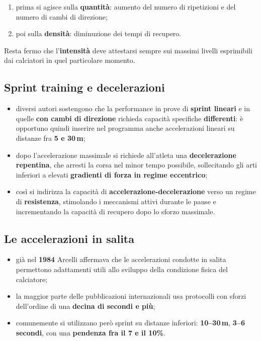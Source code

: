 \begin{enumerate}
  \item prima si agisce sulla \textbf{quantità}: aumento del numero di ripetizioni e del numero di
    cambi di direzione;
  \item poi sulla \textbf{densità}: diminuzione dei tempi di recupero.
\end{enumerate}

Resta fermo che l'\textbf{intensità} deve attestarsi sempre sui massimi livelli esprimibili dai
calciatori in quel particolare momento.

\subsection{Sprint training e decelerazioni}

\begin{itemize}
  \item diversi autori sostengono che la performance in prove di \textbf{sprint lineari} e in quelle
    \textbf{con cambi di direzione} richieda capacità specifiche \textbf{differenti}: è opportuno
    quindi inserire nel programma anche accelerazioni lineari su distanze fra \textbf{5 e 30\,m};
  \item dopo l'accelerazione massimale si richiede all'atleta una \textbf{decelerazione repentina},
    che arresti la corsa nel minor tempo possibile, sollecitando gli arti inferiori a elevati
    \textbf{gradienti di forza in regime eccentrico};
  \item così si indirizza la capacità di \textbf{accelerazione-decelerazione} verso un regime di
    \textbf{resistenza}, stimolando i meccanismi attivi durante le pause e incrementando la capacità
    di recupero dopo lo sforzo massimale.
\end{itemize}

\subsection{Le accelerazioni in salita}

\begin{itemize}
  \item già nel \textbf{1984} Arcelli affermava che le accelerazioni condotte in salita permettono
    adattamenti utili allo sviluppo della condizione fisica del calciatore;
  \item la maggior parte delle pubblicazioni internazionali usa protocolli con sforzi dell'ordine di
    una \textbf{decina di secondi e più};
  \item comunemente si utilizzano però sprint su distanze inferiori: \textbf{10--30\,m},
    \textbf{3--6 secondi}, con una \textbf{pendenza fra il 7 e il 10\%}.
\end{itemize}

